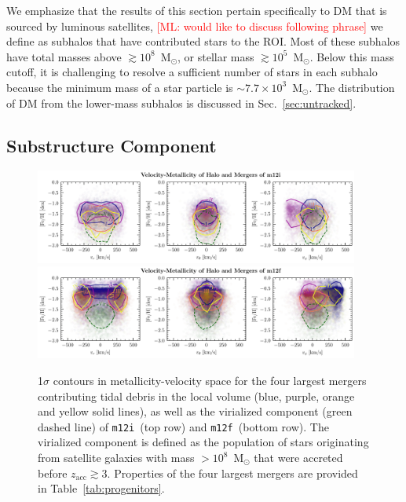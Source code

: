 \documentclass[twocolumn,preprintnumbers]{aastex6}
\DeclareRobustCommand{\Sec}[1]{Sec.~\ref{#1}}
\DeclareRobustCommand{\Tab}[1]{Table~\ref{#1}}
\newcommand{\zacc}{z_\mathrm{acc}}
\def\ML#1{\textcolor{red}{[ML: #1]}}
\newcommand{\mi}{\texttt{m12i}}
\newcommand{\mf}{\texttt{m12f}}
\begin{document}
We emphasize that the results of this section pertain specifically to DM that is sourced by luminous satellites, \ML{would like to discuss following phrase} we define as subhalos that have contributed stars to the ROI. Most of these subhalos have total masses above $\gtrsim 10^8$~M$_{\odot}$, or stellar mass $\gtrsim 10^5$~M$_{\odot}$.  Below this mass cutoff, it is challenging to resolve a sufficient number of stars in each subhalo because the minimum mass of a star particle is $\sim 7.7 \times 10^3$~M$_{\odot}$.  The distribution of DM from the lower-mass subhalos is discussed in \Sec{sec:untracked}. 

\subsection{Substructure Component}
\label{sec:debris}

\begin{figure}[tb] %
   \centering
	\includegraphics[width=0.95\textwidth]{plots/v_feh_mergersm12i.pdf} 
	\includegraphics[width=0.95\textwidth]{plots/v_feh_mergersm12f.pdf} 
   \caption{1$\sigma$ contours in metallicity-velocity space for the four largest mergers contributing tidal debris in the local volume (blue, purple, orange and yellow solid lines), as well as the virialized component (green dashed line) of \mi~(top row) and \mf~(bottom row).   The virialized component is defined as the population of stars originating from satellite galaxies with mass $>10^8$~M$_\odot$ that were accreted before $\zacc \gtrsim 3$.  Properties of the four largest mergers are provided in \Tab{tab:progenitors}.}
   \label{fig:all_mergers}
\end{figure}
\end{document}
